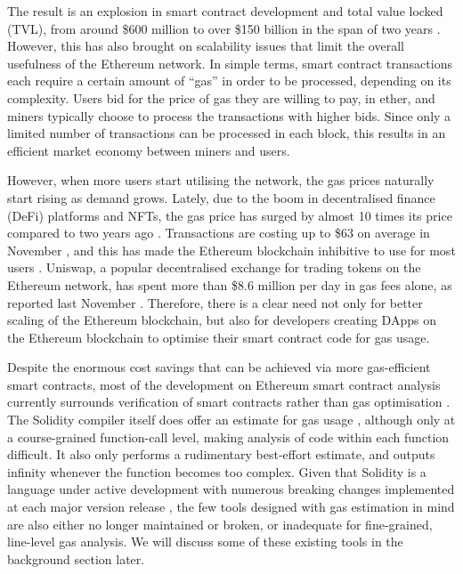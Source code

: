The result is an explosion in smart contract development and total
value locked (TVL), from around \$600 million to over \$150 billion in the
span of two years \cite{defillama}. However, this 
has also brought on scalability issues that limit the overall usefulness
of the Ethereum network. In simple terms, smart contract transactions 
each require a certain amount of ``gas'' in order to be processed, 
depending on its complexity. Users bid for the price of gas they are
willing to pay, in ether, and miners typically choose to process the 
transactions with higher bids. Since only a limited number of transactions
can be processed in each block, this results in an efficient market
economy between miners and users. 

However, when more users start utilising the network, the gas prices
naturally start rising as demand grows. Lately, due to the boom in decentralised 
finance (DeFi) platforms and NFTs, the gas price has 
surged by almost 10 times its price compared to two years ago \cite{gashistory}. 
Transactions are costing up to \$63 on average in November \cite{gasfee1}, and this has made the
Ethereum blockchain inhibitive to use for most users \cite{gasfee2}.  
Uniswap, a popular decentralised exchange for trading tokens on the Ethereum network,
has spent more than \$8.6 million per day in gas fees alone, as reported last November \cite{gasusageperday}.
Therefore, there is a clear need not only for better scaling of the Ethereum blockchain, but 
also for developers creating DApps on the Ethereum blockchain to optimise their 
smart contract code for gas usage.

Despite the enormous cost savings that can be achieved via more gas-efficient smart contracts, 
most of the development on Ethereum smart contract analysis currently
surrounds verification of smart contracts rather than gas optimisation \cite{smartcontracttools}.
The Solidity compiler itself does offer an estimate for gas usage \cite{soliditydocs}, although only at a 
course-grained function-call level, making analysis of code within each function difficult.
It also only performs a rudimentary best-effort estimate, and outputs infinity whenever the
function becomes too complex. Given that Solidity is a language under active development
with numerous breaking changes implemented at each major version release \cite{solidity07breaking} \cite{solidity08breaking}, the few tools
designed with gas estimation in mind are also either no longer maintained or broken, or
inadequate for fine-grained, line-level gas analysis. We will discuss some of these existing
tools in the background section later.

